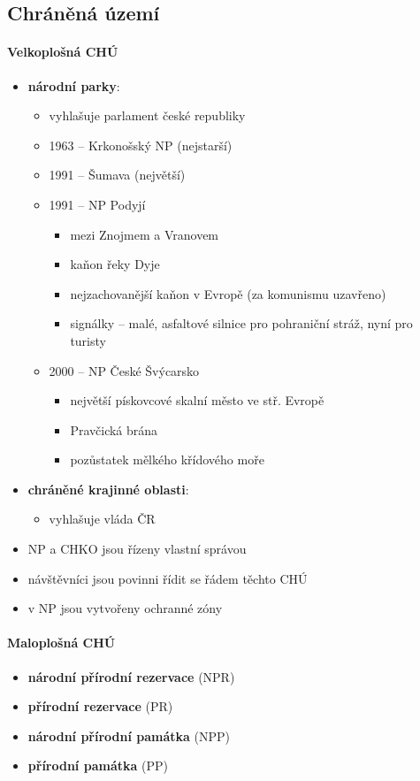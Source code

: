 \subsection{Chráněná území}
\paragraph{Velkoplošná CHÚ}
	\begin{itemize}
	\item \textbf{národní parky}: 
		\begin{itemize}
		\item vyhlašuje parlament české republiky
		\item 1963 -- Krkonošský NP (nejstarší)
		\item 1991 -- Šumava (největší)
		\item 1991 -- NP Podyjí
			\begin{itemize}
			\item mezi Znojmem a Vranovem
			\item kaňon řeky Dyje
			\item nejzachovanější kaňon v Evropě (za komunismu uzavřeno)
			\item signálky -- malé, asfaltové silnice pro pohraniční stráž, nyní pro turisty
			\end{itemize}
		\item 2000 -- NP České Švýcarsko
			\begin{itemize}
			\item největší pískovcové skalní město ve stř. Evropě
			\item Pravčická brána
			\item pozůstatek mělkého křídového moře
			\end{itemize}
		\end{itemize}
	\item \textbf{chráněné krajinné oblasti}:
		\begin{itemize}
		\item vyhlašuje vláda ČR
		\end{itemize}
	\item NP a CHKO jsou řízeny vlastní správou
	\item návštěvníci jsou povinni řídit se řádem těchto CHÚ
	\item v NP jsou vytvořeny ochranné zóny
	\end{itemize}
\paragraph{Maloplošná CHÚ}
\begin{itemize}
\item \textbf{národní přírodní rezervace} (NPR)
\item \textbf{přírodní rezervace} (PR)
\item \textbf{národní přírodní památka} (NPP)
\item \textbf{přírodní památka} (PP)
\end{itemize}

